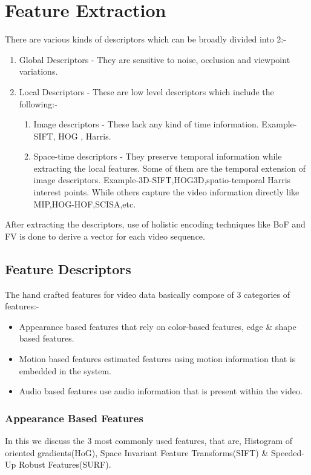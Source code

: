 \chapter{Feature Extraction}\label{Feature_Extraction}
\thispagestyle{empty}
\setlength{\parskip}{10pt plus 5pt minus 3pt}
\setlength{\parindent}{20pt}%

There are various kinds of descriptors which can be broadly divided into 2:-
\begin{enumerate}
\item Global Descriptors - They are sensitive to noise, occlusion and viewpoint variations.
\item Local Descriptors - These are low level descriptors which include the following:-
	\begin{enumerate}
		\item Image descriptors - These lack any kind of time information.
 				Example-SIFT, HOG , Harris.
 		\item Space-time descriptors - They preserve temporal information while extracting the local features. Some of them are the temporal extension of image descriptors. Example-3D-SIFT,HOG3D,spatio-temporal Harris interest points. While others capture the video information directly like MIP,HOG-HOF,SCISA,etc.
 \end{enumerate}
 \end{enumerate}
After extracting the descriptors, use of holistic encoding techniques like BoF and FV is done to derive a vector for each video sequence.

\section{Feature Descriptors}
The hand crafted features for video data basically compose of 3 categories of features:-
\begin{itemize}
\item Appearance based features that rely on color-based features, edge \& shape based features.
\item Motion based features estimated features using motion information that is embedded in the system.
\item Audio based features use audio information that is present within the video.
\end{itemize}
\subsection{Appearance Based Features}
In this we discuss the 3 most commonly used features, that are, Histogram of oriented gradients(HoG), Space Invariant Feature Transforms(SIFT) \& Speeded-Up Robust Features(SURF).
